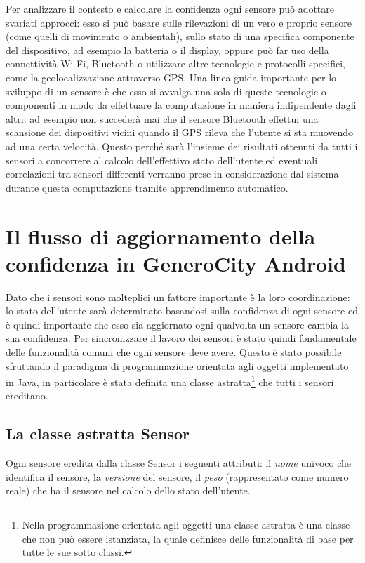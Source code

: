 Per analizzare il contesto e calcolare la confidenza ogni sensore può adottare svariati approcci: esso si può basare sulle rilevazioni di un vero e proprio sensore (come quelli di movimento o ambientali), sullo stato di una specifica componente del dispositivo, ad esempio la batteria o il display, oppure può far uso della connettività Wi-Fi, Bluetooth o utilizzare altre tecnologie e protocolli specifici, come la geolocalizzazione attraverso GPS. Una linea guida importante per lo sviluppo di un sensore è che esso si avvalga una sola di queste tecnologie o componenti in modo da effettuare la computazione in maniera indipendente dagli altri: ad esempio non succederà mai che il sensore Bluetooth effettui una scansione dei dispositivi vicini quando il GPS rileva che l'utente si sta muovendo ad una certa velocità. Questo perché sarà l'insieme dei risultati ottenuti da tutti i sensori a concorrere al calcolo dell'effettivo stato dell'utente ed eventuali correlazioni tra sensori differenti verranno prese in considerazione dal sistema durante questa computazione tramite apprendimento automatico.


\section{Il flusso di aggiornamento della confidenza in GeneroCity Android}
Dato che i sensori sono molteplici un fattore importante è la loro coordinazione: lo stato dell'utente sarà determinato basandosi sulla confidenza di ogni sensore ed è quindi importante che esso sia aggiornato ogni qualvolta un sensore cambia la sua confidenza. Per sincronizzare il lavoro dei sensori è stato quindi fondamentale delle funzionalità comuni che ogni sensore deve avere. Questo è stato possibile sfruttando il paradigma di programmazione orientata agli oggetti implementato in Java\cite{ref:Java}, in particolare è stata definita una classe astratta\footnote{Nella programmazione orientata agli oggetti una classe astratta è una classe che non può essere istanziata, la quale definisce delle funzionalità di base per tutte le sue sotto classi.} che tutti i sensori ereditano.

\subsection{La classe astratta Sensor}
Ogni sensore eredita dalla classe Sensor i seguenti attributi: il \textit{nome} univoco che identifica il sensore, la \textit{versione} del sensore, il \textit{peso} (rappresentato come numero reale) che ha il sensore nel calcolo dello stato dell'utente.

